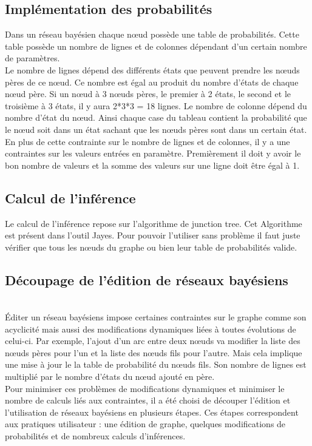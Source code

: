 \documentclass[conference]{IEEEtran}
\begin{document}
\subsection{Implémentation des probabilités}
Dans un réseau bayésien chaque nœud possède une table de probabilités. Cette table possède un nombre de lignes et de colonnes dépendant d'un certain nombre de paramètres. \\
Le nombre de lignes dépend des différents états que peuvent prendre les nœuds pères de ce nœud. Ce nombre est égal au produit du nombre d'états de chaque nœud père. Si un nœud à 3 nœuds pères, le premier à 2 états, le second et le troisième à 3 états, il y aura 2*3*3 = 18 lignes. Le nombre de colonne dépend du nombre d'état du nœud. Ainsi chaque case du tableau contient la probabilité que le nœud soit dans un état sachant que les nœuds pères sont dans un certain état.\\
En plus de cette contrainte sur le nombre de lignes et de colonnes, il y a une contraintes sur les valeurs entrées en paramètre. Premièrement il doit y avoir le bon nombre de valeurs et la somme des valeurs sur une ligne doit être égal à 1.   

\subsection{Calcul de l'inférence}
Le calcul de l'inférence repose sur l'algorithme de junction tree. Cet Algorithme est présent dans l'outil Jayes. Pour pouvoir l'utiliser sans problème il faut juste vérifier que tous les nœuds du graphe ou bien leur table de probabilités valide. 

\subsection{Découpage de l'édition de réseaux bayésiens \hfill}
\\
Éditer un réseau bayésiens impose certaines contraintes sur le graphe comme son acyclicité mais aussi des modifications dynamiques liées à toutes évolutions de celui-ci. Par exemple, l'ajout d'un arc entre deux nœuds va modifier la liste des nœuds pères pour l'un et la liste des nœuds fils pour l'autre. Mais cela implique une mise à jour le la table de probabilité du nœuds fils. Son nombre de lignes est multiplié par le nombre d'états du nœud ajouté en père. \\
Pour minimiser ces problèmes de modifications dynamiques et minimiser le nombre de calculs liés aux contraintes, il a été choisi de découper l'édition et l'utilisation de réseaux bayésiens en plusieurs étapes. Ces étapes correspondent aux pratiques utilisateur  : une édition de graphe, quelques modifications de probabilités et de nombreux calculs d'inférences. \\
\end{document}
